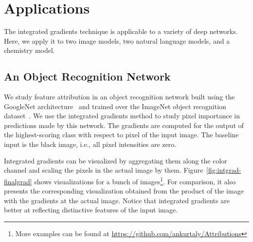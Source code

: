 \section{Applications}\label{sec:app}
The integrated gradients technique
is applicable to a variety of deep networks. Here, we
apply it to two image models, two natural language
models, and a chemistry model.

\subsection{An Object Recognition Network}\label{sec:app-incp}
We study feature attribution in an object recognition network built
using the GoogleNet architecture~\cite{SLJSRAEVR14} and trained over
the ImageNet object recognition dataset~\cite{ILSVRC15}.
We use the integrated gradients method to study pixel importance in
predictions made by this network. The gradients are computed for the
output of the highest-scoring class with respect to pixel of the input
image. The baseline input is the black image, i.e., all pixel intensities
are zero.

Integrated gradients can be visualized by aggregating them along the
color channel and scaling the pixels in the actual image by them.
Figure~\ref{fig:intgrad-finalgrad} shows visualizations for a
bunch of images\footnote{More examples can be found at
  \url{https://github.com/ankurtaly/Attributions}}.  For comparison,
it also presents the corresponding visualization obtained from the
product of the image with the gradients at the actual image.
Notice that integrated gradients are better at reflecting distinctive
features of the input image.

